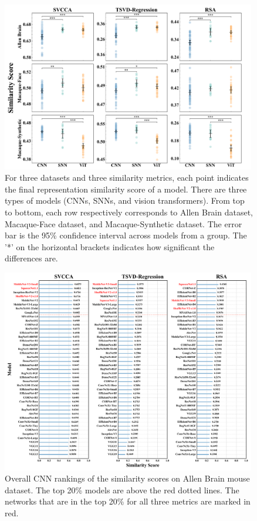 \documentclass[letterpaper]{article} %
\begin{document}
\begin{figure}[t]
	\centering
	\includegraphics[width=0.99\textwidth]{figs/model_type_compare.pdf}
	\caption{For three datasets and three similarity metrics, each point indicates the final representation similarity score of a model. There are three types of models (CNNs, SNNs, and vision transformers). From top to bottom, each row respectively corresponds to Allen Brain dataset, Macaque-Face dataset, and Macaque-Synthetic dataset. The error bar is the 95\% confidence interval across models from a group. The '*' on the horizontal brackets indicates how significant the differences are.}
	\label{Fig.model_type_compare}
\end{figure}

\begin{figure}[t]
	\centering
	\includegraphics[width=0.99\textwidth]{figs/cnn_model_rank_allen_natural_scenes.pdf}
	\caption{Overall CNN rankings of the similarity scores on Allen Brain mouse dataset. The top 20\% models are above the red dotted lines. The networks that are in the top 20\% for all three metrics are marked in red.}
	\label{Fig.cnn_model_rank_allen_brain}
\end{figure}
\end{document}
